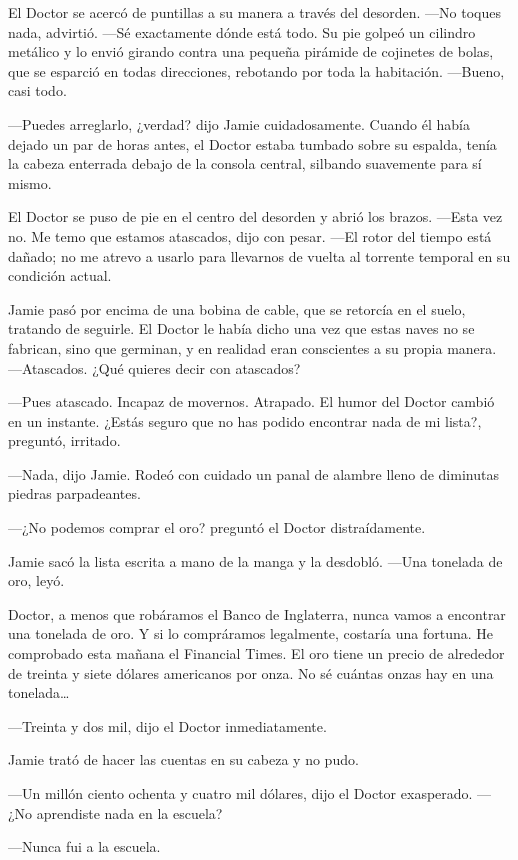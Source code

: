 El Doctor se acercó de puntillas a su manera a través del desorden.
---No toques nada, advirtió. ---Sé exactamente dónde está todo. Su pie
golpeó un cilindro metálico y lo envió girando contra una pequeña
pirámide de cojinetes de bolas, que se esparció en todas direcciones,
rebotando por toda la habitación. ---Bueno, casi todo.

---Puedes arreglarlo, ¿verdad? dijo Jamie cuidadosamente. Cuando él
había dejado un par de horas antes, el Doctor estaba tumbado sobre su
espalda, tenía la cabeza enterrada debajo de la consola central,
silbando suavemente para sí mismo.

El Doctor se puso de pie en el centro del desorden y abrió los brazos.
---Esta vez no. Me temo que estamos atascados, dijo con pesar. ---El
rotor del tiempo está dañado; no me atrevo a usarlo para llevarnos de
vuelta al torrente temporal en su condición actual.

Jamie pasó por encima de una bobina de cable, que se retorcía en el
suelo, tratando de seguirle. El Doctor le había dicho una vez que estas
naves no se fabrican, sino que  germinan, y en realidad eran conscientes
a su propia manera. ---Atascados. ¿Qué quieres decir con atascados?

---Pues atascado. Incapaz de movernos. Atrapado. El humor del Doctor
cambió en un instante. ¿Estás seguro que no has podido encontrar nada de
mi lista?, preguntó, irritado.

---Nada, dijo Jamie. Rodeó con cuidado un panal de alambre lleno de
diminutas piedras parpadeantes.

---¿No podemos comprar el oro? preguntó el Doctor distraídamente.

Jamie sacó la lista escrita a mano de la manga y la desdobló. ---Una
tonelada de oro, leyó.

Doctor, a menos que robáramos el Banco de Inglaterra, nunca vamos a
encontrar una tonelada de oro. Y si lo compráramos legalmente, costaría
una fortuna. He comprobado esta mañana el Financial Times. El oro tiene
un precio de alrededor de treinta y siete dólares americanos por onza.
No sé cuántas onzas hay en una tonelada\ldots{}

---Treinta y dos mil, dijo el Doctor inmediatamente.

Jamie trató de hacer las cuentas en su cabeza y no pudo.

---Un millón ciento ochenta y cuatro mil dólares, dijo el Doctor
exasperado. ---¿No aprendiste nada en la escuela?

---Nunca fui a la escuela.

